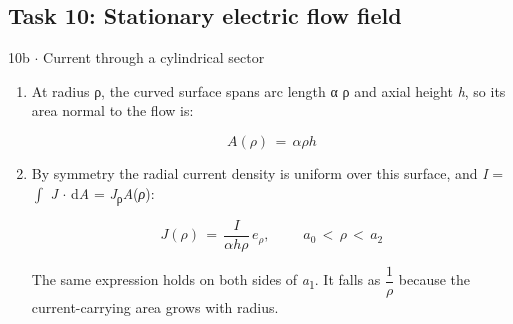 \documentclass[11pt]{article}
\begin{document}
\begin{keepsection}\subsection{Task 10: Stationary electric flow field}

\begin{workedbox}{10b \ensuremath{\cdot} Current through a cylindrical sector}
\begin{enumerate}
\item {}
At radius ρ, the curved surface spans arc length α ρ and axial height \textit{h}, so its area normal to the flow is:

\begin{equation*}{A}(ρ)\, =\, αρ{h}\end{equation*}
\item {}
By symmetry the radial current density is uniform over this surface, and \textit{I} = $\int $ \textit{J} \ensuremath{\cdot} d\textit{A} = \textit{J}\textsubscript{ρ}\textit{A}(\textit{ρ}):

\begin{equation*}{J}(ρ)\, =\, \dfrac{{I}}{α{h}ρ}\, {e}_{ρ},\quad \, \quad \, {a}_{0}\, <\, ρ\, <\, {a}_{2}\end{equation*}

The same expression holds on both sides of \textit{a}\textsubscript{1}. It falls as {\small\ensuremath{\dfrac{1}{ρ}}} because the current-carrying area grows with radius.
\end{enumerate}
\end{workedbox}

\end{keepsection}
\end{document}
